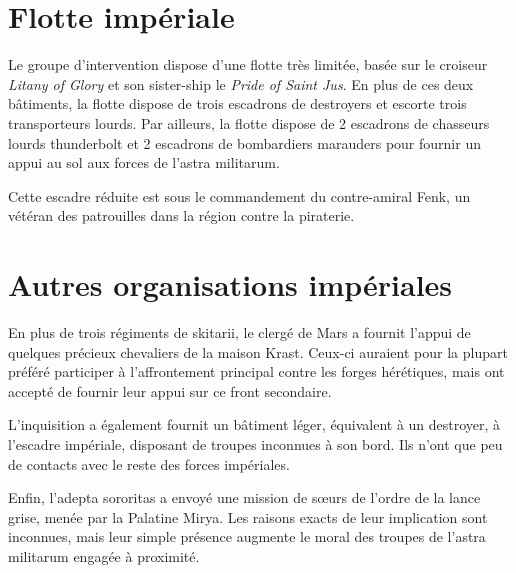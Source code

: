 \documentclass[10pt,a4paper]{book}
\begin{document}
\section{Flotte impériale}
Le groupe d'intervention dispose d'une flotte très limitée, basée sur le croiseur \emph{Litany of Glory} et son sister-ship le \emph{Pride of Saint Jus}. En plus de ces deux bâtiments, la flotte dispose de trois escadrons de destroyers et escorte trois transporteurs lourds. Par ailleurs, la flotte dispose de 2 escadrons de chasseurs lourds thunderbolt et 2 escadrons de bombardiers marauders pour fournir un appui au sol aux forces de l'astra militarum.

Cette escadre réduite est sous le commandement du contre-amiral Fenk, un vétéran des patrouilles dans la région contre la piraterie.

\section{Autres organisations impériales}
En plus de trois régiments de skitarii, le clergé de Mars a fournit l'appui de quelques précieux chevaliers de la maison Krast. Ceux-ci auraient pour la plupart préféré participer à l'affrontement principal contre les forges hérétiques, mais ont accepté de fournir leur appui sur ce front secondaire.

L'inquisition a également fournit un bâtiment léger, équivalent à un destroyer, à l'escadre impériale, disposant de troupes inconnues à son bord. Ils n'ont que peu de contacts avec le reste des forces impériales.

Enfin, l'adepta sororitas a envoyé une mission de sœurs de l'ordre de la lance grise, menée par la Palatine Mirya. Les raisons exacts de leur implication sont inconnues, mais leur simple présence augmente le moral des troupes de l'astra militarum engagée à proximité.
\end{document}
